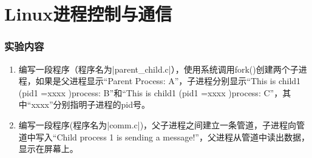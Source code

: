 \documentclass[cs4size,a4paper,nofonts]{ctexart}
\def\titlec{Linux进程控制与通信}
\begin{document}

\setcounter{part}{1}
\part{\titlec}

\iffalse
\section{实验目的}
\begin{enumerate}
\item 进一步认识并发执行的概念，认识父子进程及进程创建原理；
\item 了解Linux系统中进程通信的基本原理。
\end{enumerate}

\section{实验环境}
一台装有Linux操作系统（Fedora 7），至少具有256M内存的微机。

\section{预备知识}
\begin{enumerate}
\item gcc编译器的使用
\item fork系统调用：创建一个新进程
\item getpid系统调用：获得一个进程的pid
\item wait系统调用：发出调用的进程等待子进程结束
\item pipe系统调用：建立管道
\item write系统调用：向文件中写数据
\item read系统调用：从文件中读数据
\end{enumerate}
\fi

\section{实验内容}
\begin{enumerate}[label={(\arabic*)}]
\item 编写一段程序（程序名为|parent_child.c|），使用系统调用fork()创建两个子进程，如果是父进程显示“Parent Process: A”，子进程分别显示“This is child1 (pid1 =xxxx )process: B”和“This is child1 (pid1 =xxxx )process: C”，其中“xxxx”分别指明子进程的pid号。
\item 编写一段程序(程序名为|comm.c|)，父子进程之间建立一条管道，子进程向管道中写入“Child process 1 is sending a message!”，父进程从管道中读出数据，显示在屏幕上。
\end{enumerate}
\end{document}
